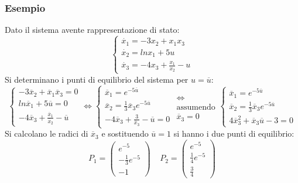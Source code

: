 \documentclass[a4paper]{report}
\begin{document}
\subsubsection{Esempio}
Dato il sistema avente rappresentazione di stato:
{\Large
  \[
    \left\{
      \begin{array}{l}
        \dot{x_1} = -3x_2 + x_1x_3\\
        \dot{x_2} = lnx_1 + 5u\\
        \dot{x_3} = -4x_3 + \frac{x_1}{x_2} - u
      \end{array}
    \right .
    \]
}
Si determinano i punti di equilibrio del sistema per $ u =
\overline{u}$:
{\large
  \[
    \left\{
      \begin{array}{l}
        -3\overline{x}_2 + \overline{x}_1\overline{x}_3 = 0\\
        ln\overline{x}_1 + 5\overline{u} = 0\\
        -4\overline{x}_3 + \frac{\overline{x}_1}{\overline{x}_2} - \overline{u}
      \end{array}
    \right .
    \Leftrightarrow
    \left\{
    \begin{array}{l}
      \overline{x}_1 = e^{-5\overline{u}}\\
      \overline{x}_2 = \frac{1}{3}\overline{x}_3 e^{-5\overline{u}}\\
      -4\overline{x}_3 + \frac{3}{\overline{x}_3} - \overline{u} = 0
    \end{array}
    \right .
    \begin{array}{l}
      \\
      \Leftrightarrow\\
      \textrm{assumendo}\\
       \overline{x}_3 = 0
    \end{array}
    \left\{
    \begin{array}{l}
      \overline{x}_1 = e^{-5\overline{u}}\\
      \overline{x}_2 = \frac{1}{3}\overline{x}_3 e^{-5\overline{u}}\\
      4\overline{x}_3^2 + \overline{x}_3 \overline{u} - 3 = 0
    \end{array}
    \right .
    \]
}
Si calcolano le radici di $\overline{x}_3$ e sostituendo $\overline{u}
= 1$ si hanno i due punti di equilibrio:
\[
  P_1 = \begin{pmatrix}
    e^{-5}\\
    -\frac{1}{3} e^{-5}\\
    -1
  \end{pmatrix}
  \;\;\;\;
  P_2 = \begin{pmatrix}
    e^{-5}\\
    \frac{1}{4} e^{-5}\\
    \frac{3}{4}
  \end{pmatrix}
\]
\end{document}
